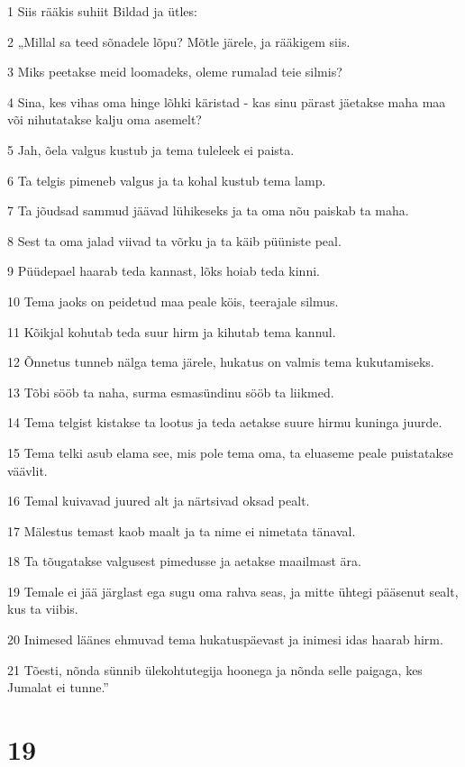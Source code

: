 \par 1 Siis rääkis suhiit Bildad ja ütles:
\par 2 „Millal sa teed sõnadele lõpu? Mõtle järele, ja rääkigem siis.
\par 3 Miks peetakse meid loomadeks, oleme rumalad teie silmis?
\par 4 Sina, kes vihas oma hinge lõhki käristad - kas sinu pärast jäetakse maha maa või nihutatakse kalju oma asemelt?
\par 5 Jah, õela valgus kustub ja tema tuleleek ei paista.
\par 6 Ta telgis pimeneb valgus ja ta kohal kustub tema lamp.
\par 7 Ta jõudsad sammud jäävad lühikeseks ja ta oma nõu paiskab ta maha.
\par 8 Sest ta oma jalad viivad ta võrku ja ta käib püüniste peal.
\par 9 Püüdepael haarab teda kannast, lõks hoiab teda kinni.
\par 10 Tema jaoks on peidetud maa peale köis, teerajale silmus.
\par 11 Kõikjal kohutab teda suur hirm ja kihutab tema kannul.
\par 12 Õnnetus tunneb nälga tema järele, hukatus on valmis tema kukutamiseks.
\par 13 Tõbi sööb ta naha, surma esmasündinu sööb ta liikmed.
\par 14 Tema telgist kistakse ta lootus ja teda aetakse suure hirmu kuninga juurde.
\par 15 Tema telki asub elama see, mis pole tema oma, ta eluaseme peale puistatakse väävlit.
\par 16 Temal kuivavad juured alt ja närtsivad oksad pealt.
\par 17 Mälestus temast kaob maalt ja ta nime ei nimetata tänaval.
\par 18 Ta tõugatakse valgusest pimedusse ja aetakse maailmast ära.
\par 19 Temale ei jää järglast ega sugu oma rahva seas, ja mitte ühtegi pääsenut sealt, kus ta viibis.
\par 20 Inimesed läänes ehmuvad tema hukatuspäevast ja inimesi idas haarab hirm.
\par 21 Tõesti, nõnda sünnib ülekohtutegija hoonega ja nõnda selle paigaga, kes Jumalat ei tunne.”

\chapter{19}

